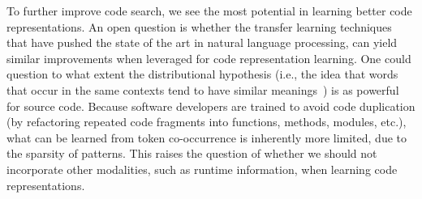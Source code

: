 \documentclass[12pt,conference, onecolumn]{IEEEtran}
\begin{document}
To further improve code search, we see the most potential in learning better code representations. An open question is whether the transfer learning techniques that have pushed the state of the art in natural language processing, can yield similar improvements when leveraged for code representation learning. One could question to what extent the distributional hypothesis (i.e., the idea that words that occur in the same contexts tend to have similar meanings~\cite{Harris:1954}) is as powerful for source code. Because software developers are trained to avoid code duplication (by refactoring repeated code fragments into functions, methods, modules, etc.), what can be learned from token co-occurrence is inherently more limited, due to the sparsity of patterns. This raises the question of whether we should not incorporate other modalities, such as runtime information, when learning code representations.
\end{document}
